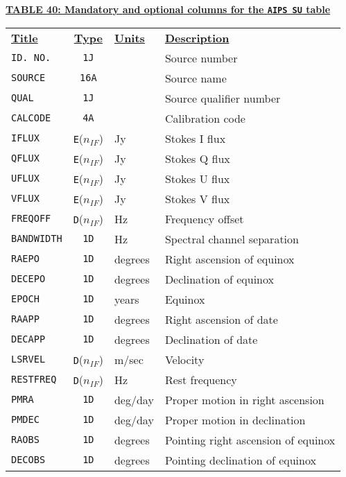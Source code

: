 \documentclass[twoside]{article}
\newcommand{\Me}[1]{\textcolor{mecol}{#1}}
\newcommand{\nif}{$n_{IF}$}
\begin{document}
\begin{center}
\underline{\bf{TABLE 40: Mandatory \Me{and optional} columns for the
    {\tt AIPS SU} table}}\\
\begin{tabular}{lcll}
\noalign{\vspace{2pt}} \label{ta:SUcols}
\underline{{\bf Title\vphantom{y}}} & \underline{\bf{Type}} &
   \underline{{\bf Units\vphantom{y}}} & \underline{\bf{Description}} \\
\noalign{\vspace{2pt}}
{\tt ID. NO.}   & {\tt 1J}      &    & Source number \\
{\tt SOURCE}    & {\tt 16A}     &    & Source name \\
{\tt QUAL}      & {\tt 1J}      &    & Source qualifier number \\
{\tt CALCODE}   & {\tt 4A}      &    & Calibration code \\
{\tt IFLUX}     & {\tt E}(\nif) & Jy & Stokes I flux \\
{\tt QFLUX}     & {\tt E}(\nif) & Jy & Stokes Q flux \\
{\tt UFLUX}     & {\tt E}(\nif) & Jy & Stokes U flux \\
{\tt VFLUX}     & {\tt E}(\nif) & Jy & Stokes V flux \\
{\tt FREQOFF}   & {\tt D}(\nif) & Hz & Frequency offset \\
{\tt BANDWIDTH} & {\tt 1D}      & Hz & Spectral channel separation \\
{\tt RAEPO}     & {\tt 1D} & degrees & Right ascension of equinox \\
{\tt DECEPO}    & {\tt 1D} & degrees & Declination of equinox \\
{\tt EPOCH}     & {\tt 1D} & years   & Equinox \\
{\tt RAAPP}     & {\tt 1D} & degrees & Right ascension of date \\
{\tt DECAPP}    & {\tt 1D} & degrees & Declination of date \\
{\tt LSRVEL}    & {\tt D}(\nif) & m/sec & Velocity \\
{\tt RESTFREQ}  & {\tt D}(\nif) & Hz & Rest frequency \\
{\tt PMRA}      & {\tt 1D} & deg/day & Proper motion in right ascension \\
{\tt PMDEC}     & {\tt 1D} & deg/day & Proper motion in declination \\
\hline
{\tt \Me{RAOBS}}  & {\tt \Me{1D}} & \Me{degrees} & \Me{Pointing right
                                       ascension of equinox} \\
{\tt \Me{DECOBS}} & {\tt \Me{1D}} & \Me{degrees} & \Me{Pointing
                                       declination of equinox}
\end{tabular}
\end{center}
\end{document}

